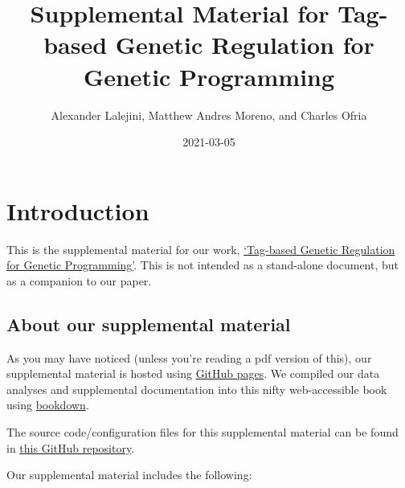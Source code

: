 \documentclass[]{book}
\title{Supplemental Material for Tag-based Genetic Regulation for Genetic Programming}
\author{Alexander Lalejini, Matthew Andres Moreno, and Charles Ofria}
\date{2021-03-05}
\begin{document}
\maketitle

{
\setcounter{tocdepth}{1}
\tableofcontents
}
\hypertarget{introduction}{%
\chapter{Introduction}\label{introduction}}

This is the supplemental material for our work, \href{https://arxiv.org/abs/2012.09229}{`Tag-based Genetic Regulation for Genetic Programming'}.
This is not intended as a stand-alone document, but as a companion to our paper.

\hypertarget{about-our-supplemental-material}{%
\section{About our supplemental material}\label{about-our-supplemental-material}}

As you may have noticed (unless you're reading a pdf version of this), our supplemental material is hosted using \href{https://pages.github.com/}{GitHub pages}.
We compiled our data analyses and supplemental documentation into this nifty web-accessible book using \href{https://bookdown.org}{bookdown}.

The source code/configuration files for this supplemental material can be found in \href{https://github.com/amlalejini/Tag-based-Genetic-Regulation-for-LinearGP}{this GitHub repository}.

Our supplemental material includes the following:
\end{document}
